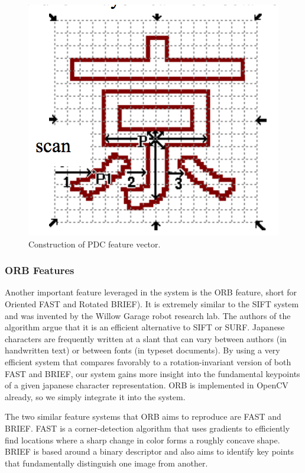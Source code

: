 \documentclass[10pt,twocolumn,letterpaper]{article}
\begin{document}
\begin{figure}[t]
    \centering
    \includegraphics[width=0.7\columnwidth]{../pdc.png}
    \caption{Construction of PDC feature vector.}
\end{figure}


\subsubsection{ORB Features}
Another important feature leveraged in the system is the ORB feature, short for Oriented FAST and Rotated BRIEF). It is extremely similar to the SIFT system and was invented by the Willow Garage robot research lab. The authors of the algorithm argue that it is an efficient alternative to SIFT or SURF. Japanese characters are frequently written at a slant that can vary between authors (in handwritten text) or between fonts (in typeset documents). By using a very efficient system that compares favorably to a rotation-invariant version of both FAST and BRIEF, our system gains more insight into the fundamental keypoints of a given japanese character representation. ORB is implemented in OpenCV already, so we simply integrate it into the system.

The two similar feature systems that ORB aims to reproduce are FAST and BRIEF. FAST is a corner-detection algorithm that uses gradients to efficiently find locations where a sharp change in color forms a roughly concave shape. BRIEF is based around a binary descriptor and also aims to identify key points that fundamentally distinguish one image from another.
\end{document}
